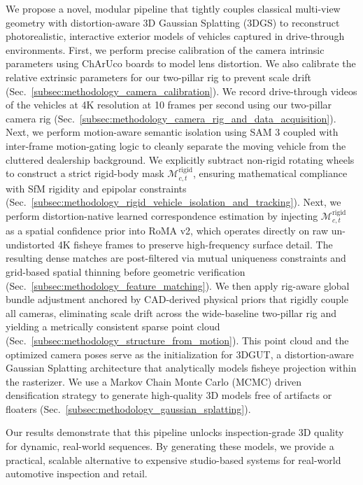 \documentclass[letterpaper, 10 pt, conference]{ieeeconf}  %
\begin{document}
We propose a novel, modular pipeline that tightly couples classical multi-view geometry with distortion-aware 3D Gaussian Splatting (3DGS) to reconstruct photorealistic, interactive exterior models of vehicles captured in drive-through environments. First, we perform precise calibration of the camera intrinsic parameters using ChArUco boards to model lens distortion. We also calibrate the relative extrinsic parameters for our two-pillar rig to prevent scale drift (Sec.~\ref{subsec:methodology_camera_calibration}). We record drive-through videos of the vehicles at 4K resolution at 10 frames per second using our two-pillar camera rig (Sec.~\ref{subsec:methodology_camera_rig_and_data_acquisition}). Next, we perform motion-aware semantic isolation using SAM 3 coupled with inter-frame motion-gating logic to cleanly separate the moving vehicle from the cluttered dealership background. We explicitly subtract non-rigid rotating wheels to construct a strict rigid-body mask $\mathcal{M}^{\text{rigid}}_{c,t}$, ensuring mathematical compliance with SfM rigidity and epipolar constraints (Sec.~\ref{subsec:methodology_rigid_vehicle_isolation_and_tracking}). Next, we perform distortion-native learned correspondence estimation by injecting $\mathcal{M}^{\text{rigid}}_{c,t}$
 as a spatial confidence prior into RoMA v2, which operates directly on raw un-undistorted 4K fisheye frames to preserve high-frequency surface detail. The resulting dense matches are post-filtered via mutual uniqueness constraints and grid-based spatial thinning before geometric verification (Sec.~\ref{subsec:methodology_feature_matching}). We then apply rig-aware global bundle adjustment anchored by CAD-derived physical priors that rigidly couple all cameras, eliminating scale drift across the wide-baseline two-pillar rig and yielding a metrically consistent sparse point cloud (Sec.~\ref{subsec:methodology_structure_from_motion}). This point cloud and the optimized camera poses serve as the initialization for 3DGUT, a distortion-aware Gaussian Splatting architecture that analytically models fisheye projection within the rasterizer. We use a Markov Chain Monte Carlo (MCMC) driven densification strategy to generate high-quality 3D models free of artifacts or floaters (Sec.~\ref{subsec:methodology_gaussian_splatting}).


Our results demonstrate that this pipeline unlocks inspection-grade 3D quality for dynamic, real-world sequences. By generating these models, we provide a practical, scalable alternative to expensive studio-based systems for real-world automotive inspection and retail.
\end{document}
